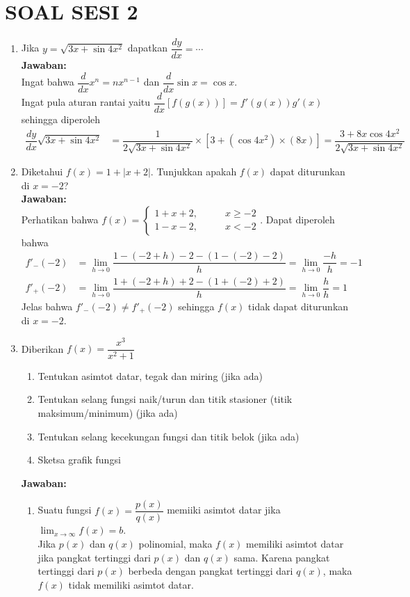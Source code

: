\documentclass{article}
\begin{document}
\section*{SOAL SESI 2}
\begin{enumerate}
	\item Jika $y=\sqrt{3x+\sin 4x^2}$ dapatkan $\dfrac{dy}{dx}=\cdots$\\
	\textbf{Jawaban:}\\
	Ingat bahwa $\dfrac{d}{dx} x^n = nx^{n-1}$ dan $\dfrac{d}{dx} \sin x = \cos x$. \\
	Ingat pula aturan rantai yaitu $\dfrac{d}{dx} [f(g(x))]=f'(g(x)) g'(x)$ sehingga diperoleh 
 	\begin{align*}
 	\dfrac{dy}{dx} \sqrt{3x+\sin 4x^2} &= \dfrac{1}{2\sqrt{3x+\sin 4x^2}}\times [3+(\cos 4x^2)\times (8x)] = \dfrac{3+8x\cos 4x^2}{2\sqrt{3x+\sin 4x^2}}
 	\end{align*}
	\item Diketahui $f(x)=1+|x+2|$. Tunjukkan apakah $f(x)$ dapat diturunkan di $x=-2$?\\
	\textbf{Jawaban:}\\
	Perhatikan bahwa $f(x)=\begin{cases}1+x+2,\qquad &x\geq -2\\
	1-x-2,\qquad &x< -2\end{cases}$. Dapat diperoleh bahwa 
	\begin{align*}
	f'_-(-2) &= \lim_{h\rightarrow 0} \dfrac{1-(-2+h)-2-(1-(-2)-2)}{h} = \lim_{h\rightarrow 0} \dfrac{-h}{h} = -1\\
	f'_+(-2) &= \lim_{h\rightarrow 0} \dfrac{1+(-2+h)+2-(1+(-2)+2)}{h} =\lim_{h\rightarrow 0} \dfrac{h}{h} = 1
	\end{align*}
	Jelas bahwa $f'_-(-2) \neq f'_+(-2)$ sehingga $f(x)$ tidak dapat diturunkan di $x=-2$.
	\item Diberikan $f(x)=\dfrac{x^3}{x^2+1}$
	\begin{enumerate}
		\item Tentukan asimtot datar, tegak dan miring (jika ada)
		\item Tentukan selang fungsi naik/turun dan titik stasioner (titik maksimum/minimum) (jika ada)
		\item Tentukan selang kecekungan fungsi dan titik belok (jika ada)
		\item Sketsa grafik fungsi
	\end{enumerate}
	\textbf{Jawaban:}
	\begin{enumerate}
		\item Suatu fungsi $f(x)=\dfrac{p(x)}{q(x)}$ memiiki asimtot datar jika $\displaystyle \lim_{x\rightarrow \infty} f(x) = b$.\\ Jika $p(x)$ dan $q(x)$ polinomial, maka $f(x)$ memiliki asimtot datar jika pangkat tertinggi dari $p(x)$ dan $q(x)$ sama. Karena pangkat tertinggi dari $p(x)$ berbeda dengan pangkat tertinggi dari $q(x)$, maka $f(x)$ tidak memiliki asimtot datar. \\

\end{enumerate}
\end{enumerate}
\end{document}
